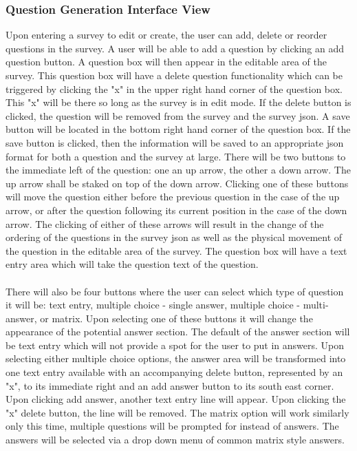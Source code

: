 \subsubsection{Question Generation Interface View}
Upon entering a survey to edit or create, the user can add, delete or reorder questions in the survey. A user will be able to add a 
question by clicking an add question button. A question box will then appear in the editable area of the survey. This question box will 
have a delete question functionality which can be triggered by clicking the "x" in the upper right hand corner of the question box. This
"x" will be there so long as the survey is in edit mode.  If the delete button is clicked, the question will be removed from the survey and the survey json. A save button will be located in the bottom right hand corner of the question box. If the save button is clicked, then the information will be saved to an appropriate json format for both a question and the survey at 
large. There will be two buttons to the immediate left of the question: one an up arrow, the other a down arrow. The up arrow
shall be staked on top of the down arrow. Clicking one of these buttons will move the question either before the previous question
 in the case of the up arrow, or after the question following its current position in the case of the down arrow. The clicking of either 
of these arrows will result in the change of the ordering of the questions in the survey json as well as the physical movement of the 
question in the editable area of the survey. The question box will have a text entry area which will take the question text of 
the question. \\ \\
There will also be four buttons where the user can select which type of question it will be: text entry, multiple choice - 
single answer, multiple choice - multi-answer, or matrix. Upon selecting one of these buttons it will change the appearance of the 
potential answer section. The default of the answer section will be text entry which will not provide a spot for the user to put in answers. 
Upon selecting either multiple choice options, the answer area will be transformed into one text entry available with an accompanying 
delete button, represented by an "x", to its immediate right and an add answer button to its south east corner. Upon clicking add 
answer, another text entry line will appear. Upon clicking the "x" delete button, the line will be removed. The matrix option will work similarly only this time, multiple questions will be prompted for instead of answers. The answers will be selected via a drop down menu
 of common matrix style answers. \\ \\

